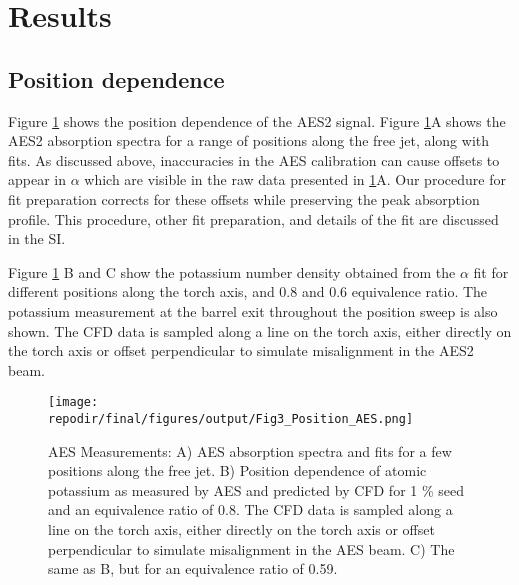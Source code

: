 

\section{Results}

\subsection{Position dependence}

Figure \ref{fig:pos_dependence_aes} shows the position dependence of the AES2 signal. Figure \ref{fig:pos_dependence_aes}A shows the AES2 absorption spectra for a range of positions along the free jet, along with fits. As discussed above, inaccuracies in the AES calibration can cause offsets to appear in $\alpha$ which are visible in the raw data presented in \ref{fig:pos_dependence_aes}A. Our procedure for fit preparation corrects for these offsets while preserving the peak absorption profile. This procedure, other fit preparation, and details of the fit are discussed in the SI. 

Figure \ref{fig:pos_dependence_aes} B and C show the potassium number density obtained from the $\alpha$ fit for different positions along the torch axis, and 0.8 and 0.6 equivalence ratio. The potassium measurement at the barrel exit throughout the position sweep is also shown. The CFD data is sampled along a line on the torch axis, either directly on the torch axis or offset perpendicular to simulate misalignment in the AES2 beam. 

\begin{figure}[h]
    \texttt{[image: \\repodir/final/figures/output/Fig3\_Position\_AES.png]} 
    \caption{AES Measurements: A) AES absorption spectra and fits for a few positions along the free jet. B) Position dependence of atomic potassium as measured by AES and predicted by CFD for 1 \% seed and an equivalence ratio of 0.8. The CFD data is sampled along a line on the torch axis, either directly on the torch axis or offset perpendicular to simulate misalignment in the AES beam. C) The same as B, but for an equivalence ratio of 0.59. }
    \label{fig:pos_dependence_aes}
\end{figure}

